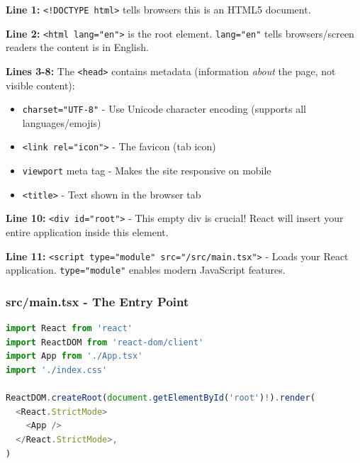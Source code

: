 \documentclass[12pt,a4paper]{article}
\begin{document}
\begin{explanation}
\textbf{Line 1:} \texttt{<!DOCTYPE html>} tells browsers this is an HTML5 document.

\textbf{Line 2:} \texttt{<html lang="en">} is the root element. \texttt{lang="en"} tells browsers/screen readers the content is in English.

\textbf{Lines 3-8:} The \texttt{<head>} contains metadata (information \textit{about} the page, not visible content):
\begin{itemize}
    \item \texttt{charset="UTF-8"} - Use Unicode character encoding (supports all languages/emojis)
    \item \texttt{<link rel="icon">} - The favicon (tab icon)
    \item \texttt{viewport} meta tag - Makes the site responsive on mobile
    \item \texttt{<title>} - Text shown in the browser tab
\end{itemize}

\textbf{Line 10:} \texttt{<div id="root">} - This empty div is crucial! React will insert your entire application inside this element.

\textbf{Line 11:} \texttt{<script type="module" src="/src/main.tsx">} - Loads your React application. \texttt{type="module"} enables modern JavaScript features.
\end{explanation}

\subsubsection{src/main.tsx - The Entry Point}

\begin{lstlisting}[language=JavaScript,caption={src/main.tsx}]
import React from 'react'
import ReactDOM from 'react-dom/client'
import App from './App.tsx'
import './index.css'

ReactDOM.createRoot(document.getElementById('root')!).render(
  <React.StrictMode>
    <App />
  </React.StrictMode>,
)
\end{lstlisting}
\end{document}
